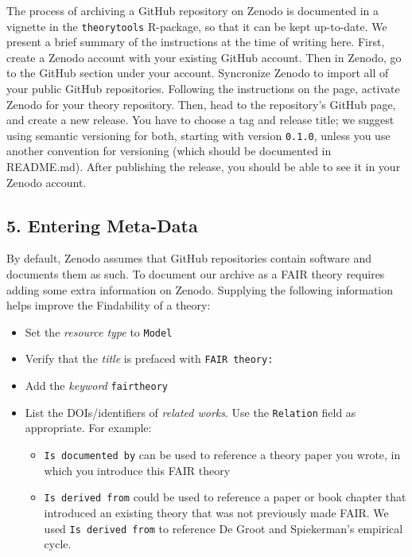 \documentclass[
  man,floatsintext]{apa6}
\providecommand{\tightlist}{%
  \setlength{\itemsep}{0pt}\setlength{\parskip}{0pt}}
\begin{document}
The process of archiving a GitHub repository on Zenodo is documented in a vignette in the \texttt{theorytools} R-package, so that it can be kept up-to-date.
We present a brief summary of the instructions at the time of writing here.
First, create a Zenodo account with your existing GitHub account.
Then in Zenodo, go to the GitHub section under your account.
Syncronize Zenodo to import all of your public GitHub repositories.
Following the instructions on the page, activate Zenodo for your theory repository.
Then, head to the repository's GitHub page, and create a new release.
You have to choose a tag and release title;
we suggest using semantic versioning for both, starting with version \texttt{0.1.0}, unless you use another convention for versioning (which should be documented in README.md).
After publishing the release,
you should be able to see it in your Zenodo account.

\subsection{5. Entering Meta-Data}\label{entering-meta-data}

By default, Zenodo assumes that GitHub repositories contain software and documents them as such.
To document our archive as a FAIR theory requires adding some extra information on Zenodo.
Supplying the following information helps improve the Findability of a theory:

\begin{itemize}
\tightlist
\item
  Set the \emph{resource type} to \texttt{Model}
\item
  Verify that the \emph{title} is prefaced with \texttt{FAIR\ theory:}
\item
  Add the \emph{keyword} \texttt{fairtheory}
\item
  List the DOIs/identifiers of \emph{related works}. Use the \texttt{Relation} field as appropriate. For example:

  \begin{itemize}
  \tightlist
  \item
    \texttt{Is\ documented\ by} can be used to reference a theory paper you wrote, in which you introduce this FAIR theory
  \item
    \texttt{Is\ derived\ from} could be used to reference a paper or book chapter that introduced an existing theory that was not previously made FAIR. We used \texttt{Is\ derived\ from} to reference De Groot and Spiekerman's empirical cycle.
  \end{itemize}
\end{itemize}
\end{document}
